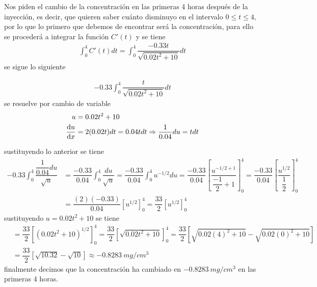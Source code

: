 \documentclass[legalpaper, 12pt]{exam}
\begin{document}
\begin{questions}
\begin{solution}
Nos piden el cambio de la concentración en las primeras 4 horas después de la inyección, es decir, que quieren saber cuánto disminuyo en el intervalo $0\leq t \leq 4$, por lo que lo primero que debemos de encontrar será la concentración, para ello se procederá a integrar la función $C'(t)$ y se tiene
\begin{align*}
\int_0^4 C'(t) dt = \int_0^4 \dfrac{-0.33t}{\sqrt{0.02t^2 + 10}}dt
\end{align*}
se sigue lo siguiente
\begin{multicols}{2}
\begin{align*}
-0.33 \int_0^4 \dfrac{t}{\sqrt{0.02t^2 + 10}}dt
\end{align*}
se resuelve por cambio de variable\\
\begin{align*}
u &= 0.02t^2 + 10\\
\dv{u}{x} &= 2(0.02t)dt = 0.04t dt\Rightarrow \dfrac{1}{0.04} du = t dt
\end{align*}
\end{multicols}
sustituyendo lo anterior se tiene
\begin{align*}
-0.33 \int_0^4 \dfrac{\dfrac{1}{0.04} du}{\sqrt{u}} &= \dfrac{-0.33}{0.04}\int_0^4\dfrac{du}{\sqrt{u}} = \dfrac{-0.33}{0.04}\int_0^4u^{-1/2}du = \dfrac{-0.33}{0.04}\left[\dfrac{u^{-1/2 + 1}}{\dfrac{-1}{2} + 1}\right]_0^4 = \dfrac{-0.33}{0.04}\left[\dfrac{u^{1/2}}{\dfrac{1}{2}}\right]_0^4 \\
&= \dfrac{(2)(-0.33)}{0.04}\left[u^{1/2}\right]_0^4 = \dfrac{33}{2}\left[u^{1/2}\right]_0^4
\end{align*}
sustituyendo $u = 0.02t^2 + 10$ se tiene
\begin{align*}
&= \dfrac{33}{2}\left[\left(0.02t^2 + 10\right)^{1/2}\right]_0^4 = \dfrac{33}{2}\left[\sqrt{0.02t^2 + 10}\right]_0^4 = \dfrac{33}{2}\left[\sqrt{0.02(4)^2 + 10} - \sqrt{0.02(0)^2 + 10}\right] \\
&= \dfrac{33}{2}\left[\sqrt{10.32} - \sqrt{10}\right] \approx -0.8283\ mg/cm^3
\end{align*}
finalmente decimos que la concentración ha cambiado en $-0.8283\ mg/cm^3$ en las primeras 4 horas.
\end{solution}
 \vspace{0.15in}

\end{questions}
\end{document}
